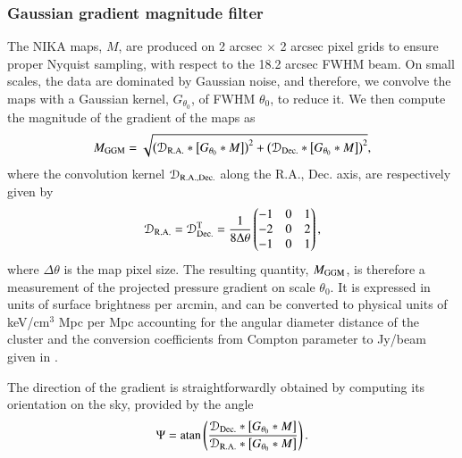 \documentclass[twocolumn,traditabstract]{aa}
\begin{document}
\subsubsection{Gaussian gradient magnitude filter}
The NIKA maps, $M$, are produced on 2 arcsec $\times$ 2 arcsec pixel grids to ensure proper Nyquist sampling, with respect to the 18.2 arcsec FWHM beam. On small scales, the data are dominated by Gaussian noise, and therefore, we convolve the maps with a Gaussian kernel, $G_{\theta_0}$, of FWHM $\theta_0$, to reduce it. We then compute the magnitude of the gradient of the maps as 
\begin{equation}
	M_{\rm GGM} = \sqrt{\left(\mathcal{D}_{\rm R.A.} \ast \left[G_{\theta_0} \ast M\right]\right)^2 + \left(\mathcal{D}_{\rm Dec.} \ast \left[G_{\theta_0} \ast M\right]\right)^2},
	\label{eq:GGM_filter}
\end{equation}
where the convolution kernel $\mathcal{D}_{\rm R.A., Dec.}$ along the R.A., Dec. axis, are respectively given by
\begin{equation}
	\mathcal{D}_{\rm R.A.}= \mathcal{D}_{\rm Dec.}^{\rm T} = \frac{1}{8 \Delta \theta}
	\begin{pmatrix}
	-1 & 0 & 1\\
	-2 & 0 & 2\\
	-1 & 0 & 1
	\end{pmatrix},
	\label{eq:GGM_kernel}
\end{equation}
where $\Delta \theta$ is the map pixel size. The resulting quantity, $M_{\rm GGM}$, is therefore a measurement of the projected pressure gradient on scale $\theta_0$. It is expressed in units of surface brightness per arcmin, and can be converted to physical units of keV/cm$^3$ Mpc per Mpc accounting for the angular diameter distance of the cluster and the conversion coefficients from Compton parameter to Jy/beam given in \cite{Adam2016b}.

The direction of the gradient is straightforwardly obtained by computing its orientation on the sky, provided by the angle
\begin{equation}
	\Psi = {\rm atan} \left( \frac{\mathcal{D}_{\rm Dec.} \ast \left[G_{\theta_0} \ast M\right]}{\mathcal{D}_{\rm R.A.} \ast \left[G_{\theta_0} \ast M\right]} \right).
	\label{eq:GGM_angle}
\end{equation}

\end{document}
